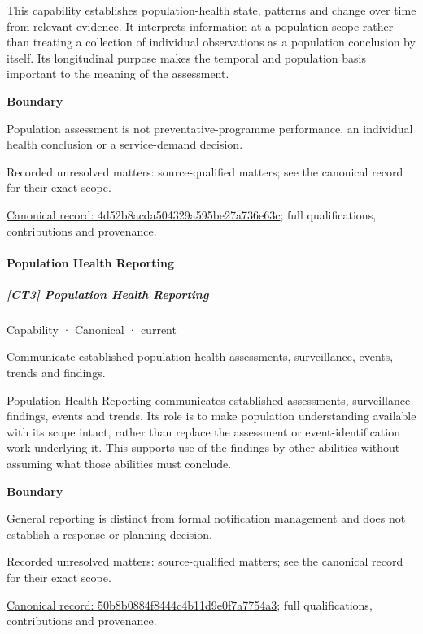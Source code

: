 This capability establishes population-health state, patterns and change over time from relevant evidence. It interprets information at a population scope rather than treating a collection of individual observations as a population conclusion by itself. Its longitudinal purpose makes the temporal and population basis important to the meaning of the assessment.



\textbf{Boundary}



Population assessment is not preventative-programme performance, an individual health conclusion or a service-demand decision.


{\small Recorded unresolved matters: source-qualified matters; see the canonical record for their exact scope.}\par
{\footnotesize \href{../../../../continuum/strategy/capability/4d52b8acda504329a595be27a736e63c.md}{Canonical record: 4d52b8acda504329a595be27a736e63c}; full qualifications, contributions and provenance.}\par
\paragraph{Population Health Reporting}

\subparagraph{[CT3] Population Health Reporting}

\label{element:50b8b0884f8444c4b11d9e0f7a7754a3}
{\small Capability · Canonical · current}\par

Communicate established population-health assessments, surveillance, events, trends and findings.



Population Health Reporting communicates established assessments, surveillance findings, events and trends. Its role is to make population understanding available with its scope intact, rather than replace the assessment or event-identification work underlying it. This supports use of the findings by other abilities without assuming what those abilities must conclude.



\textbf{Boundary}



General reporting is distinct from formal notification management and does not establish a response or planning decision.


{\small Recorded unresolved matters: source-qualified matters; see the canonical record for their exact scope.}\par
{\footnotesize \href{../../../../continuum/strategy/capability/50b8b0884f8444c4b11d9e0f7a7754a3.md}{Canonical record: 50b8b0884f8444c4b11d9e0f7a7754a3}; full qualifications, contributions and provenance.}\par

